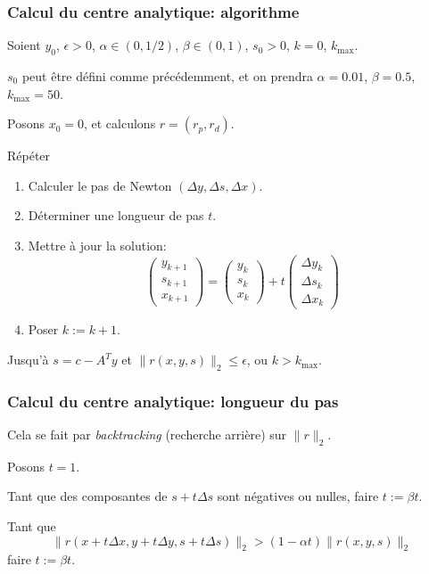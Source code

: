 \documentclass[usepdftitle=false, aspectratio=169]{beamer}
\begin{document}
\begin{frame}
	\frametitle{Calcul du centre analytique: algorithme}
	
	Soient $y_0$, $\epsilon > 0$, $\alpha \in (0, 1/2)$, $\beta \in (0,1)$, $s_0 > 0$, $k = 0$, $k_{\max}$.
	
	$s_0$ peut être défini comme précédemment, et on prendra $\alpha = 0.01$, $\beta = 0.5$, $k_{\max} = 50$.
	
	Posons $x_0 = 0$, et calculons $r = (r_p, r_d)$.
	
	Répéter
	\begin{enumerate}
		\item Calculer le pas de Newton $(\Delta y, \Delta s, \Delta x)$.
		\item Déterminer une longueur de pas $t$.
		\item Mettre à jour la solution:
		$$
		\begin{pmatrix}
			y_{k+1} \\ s_{k+1} \\ x_{k+1}
		\end{pmatrix}
		= 
		\begin{pmatrix}
			y_{k} \\ s_{k} \\ x_{k} 
		\end{pmatrix}
		+ t
		\begin{pmatrix}
			\Delta y_{k} \\ \Delta s_{k} \\ \Delta x_{k} 
		\end{pmatrix}
		$$
		\item Poser $k :=  k+1$.
	\end{enumerate}
	Jusqu'à $s = c - A^Ty$ et $\| r(x,y,s) \|_2 \leq \epsilon$, ou $k > k_{\max}$.
	
\end{frame}

\begin{frame}
	\frametitle{Calcul du centre analytique: longueur du pas}
	
	Cela se fait par \textit{backtracking} (recherche arrière) sur $\| r \|_2$.
	
	\mbox{}
	
	Posons $t = 1$.
	
	\mbox{}
	
	Tant que des composantes de $s + t\Delta s$ sont négatives ou nulles, faire $t := \beta t$.
	
	\mbox{}
	
	Tant que
	$$
	\|r(x + t\Delta x, y + t\Delta y, s + t\Delta s) \|_2 > (1 - \alpha t) \| r(x,y,s) \|_2
	$$
	faire $t := \beta t$.
	
\end{frame}
\end{document}
